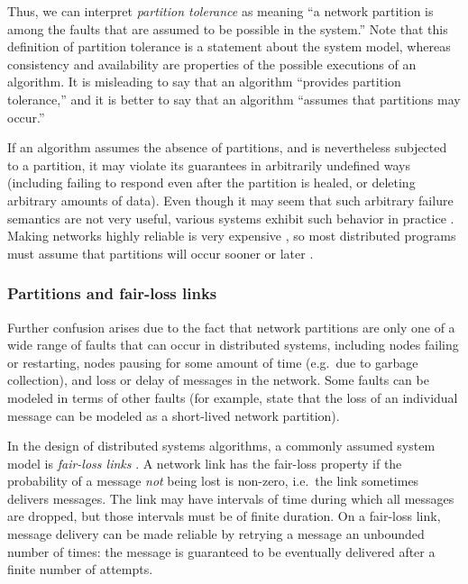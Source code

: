 \documentclass[fleqn,12pt,lineno]{wlpeerj} %
\begin{document}
Thus, we can interpret \emph{partition tolerance} as meaning ``a network partition is among the
faults that are assumed to be possible in the system.'' Note that this definition of partition
tolerance is a statement about the system model, whereas consistency and availability are properties
of the possible executions of an algorithm. It is misleading to say that an algorithm ``provides
partition tolerance,'' and it is better to say that an algorithm ``assumes that partitions may
occur.''

If an algorithm assumes the absence of partitions, and is nevertheless subjected to a partition, it
may violate its guarantees in arbitrarily undefined ways (including failing to respond even after
the partition is healed, or deleting arbitrary amounts of data). Even though it may seem that such
arbitrary failure semantics are not very useful, various systems exhibit such behavior in
practice \citep{Kingsbury2014tk,Kingsbury2015uk}. Making networks highly reliable is very
expensive \citep{Bailis2014jx}, so most distributed programs must assume that partitions will occur
sooner or later \citep{Hale2010we}.

\subsubsection{Partitions and fair-loss links}\label{sec:fairloss}

Further confusion arises due to the fact that network partitions are only one of a wide range of
faults that can occur in distributed systems, including nodes failing or restarting, nodes pausing
for some amount of time (e.g.\ due to garbage collection), and loss or delay of messages in the
network. Some faults can be modeled in terms of other faults (for example, \citet{Gilbert2002il}
state that the loss of an individual message can be modeled as a short-lived network partition).

In the design of distributed systems algorithms, a commonly assumed system model is \emph{fair-loss
links} \citep{Cachin2011wt}. A network link has the fair-loss property if the probability of a
message \emph{not} being lost is non-zero, i.e.\ the link sometimes delivers messages. The link may
have intervals of time during which all messages are dropped, but those intervals must be of finite
duration. On a fair-loss link, message delivery can be made reliable by retrying a message an
unbounded number of times: the message is guaranteed to be eventually delivered after a finite
number of attempts.
\end{document}
